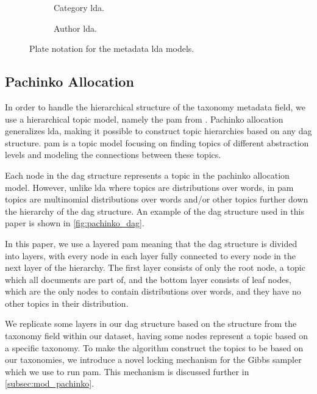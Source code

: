 \begin{figure*}[ht]
	\centering
	\begin{subfigure}{0.3\textwidth}
		\centering
		\resizebox{\textwidth}{!}{%
		
		}
		\caption{Category \gls{lda}.}
		\label{fig:category_lda}
	\end{subfigure}
	\hspace{2em}
	\begin{subfigure}{0.3\textwidth}
		\centering
		\resizebox{\textwidth}{!}{%
			
		}
		\caption{Author \gls{lda}.}
		\label{fig:author_lda}
	\end{subfigure}
	\caption{Plate notation for the metadata \gls{lda} models.}
	\label{fig:metadata_lda}
\end{figure*}

\subsection{Pachinko Allocation}
In order to handle the hierarchical structure of the taxonomy metadata field, we use a hierarchical topic model, namely the \acrfull{pam} from \citet{li2006pachinko}.
Pachinko allocation generalizes \gls{lda}, making it possible to construct topic hierarchies based on any \gls{dag} structure.
\gls{pam} is a topic model focusing on finding topics of different abstraction levels and modeling the connections between these topics. 

Each node in the \gls{dag} structure represents a topic in the pachinko allocation model. 
However, unlike \gls{lda} where topics are distributions over words, in \gls{pam} topics are multinomial distributions over words and/or other topics further down the hierarchy of the \gls{dag} structure.
An example of the \gls{dag} structure used in this paper is shown in \autoref{fig:pachinko_dag}.

In this paper, we use a layered \gls{pam} meaning that the \gls{dag} structure is divided into layers, with every node in each layer fully connected to every node in the next layer of the hierarchy.
The first layer consists of only the root node, a topic which all documents are part of, and the bottom layer consists of leaf nodes, which are the only nodes to contain distributions over words, and they have no other topics in their distribution.

We replicate some layers in our \gls{dag} structure based on the structure from the taxonomy field within our dataset, having some nodes represent a topic based on a specific taxonomy.
To make the algorithm construct the topics to be based on our taxonomies, we introduce a novel locking mechanism for the Gibbs sampler which we use to run \gls{pam}.
This mechanism is discussed further in \autoref{subsec:mod_pachinko}.

